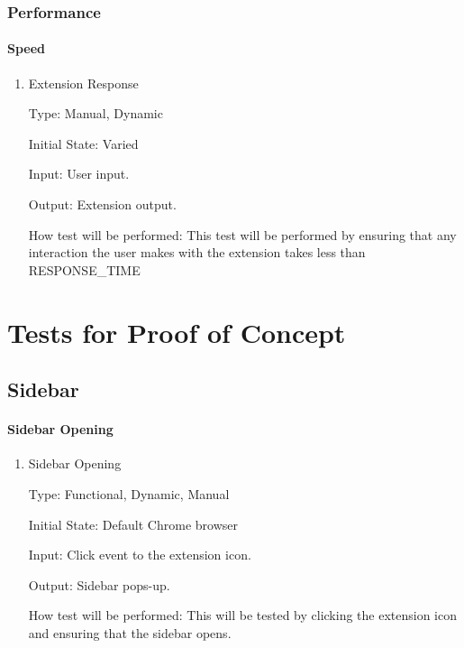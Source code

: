 \documentclass[12pt, titlepage]{article}
\begin{document}
\subsubsection{Performance}

\paragraph{Speed}

\begin{enumerate}
	
	\item{Extension Response\\}
	
	Type: Manual, Dynamic
	
	Initial State: Varied
	
	Input: User input.
	
	Output: Extension output.
	
	How test will be performed: This test will be performed by ensuring that any interaction 
	the user makes with the extension takes less than RESPONSE\_TIME
	
\end{enumerate}

\section{Tests for Proof of Concept}

\subsection{Sidebar}
		
\paragraph{Sidebar Opening}

\begin{enumerate}

\item{Sidebar Opening\\}

Type: Functional, Dynamic, Manual
					
Initial State: Default Chrome browser
					
Input: Click event to the extension icon.
					
Output: Sidebar pops-up.
					
How test will be performed: This will be tested by clicking the extension icon and ensuring 
that the sidebar opens. 

\end{enumerate}
\end{document}

